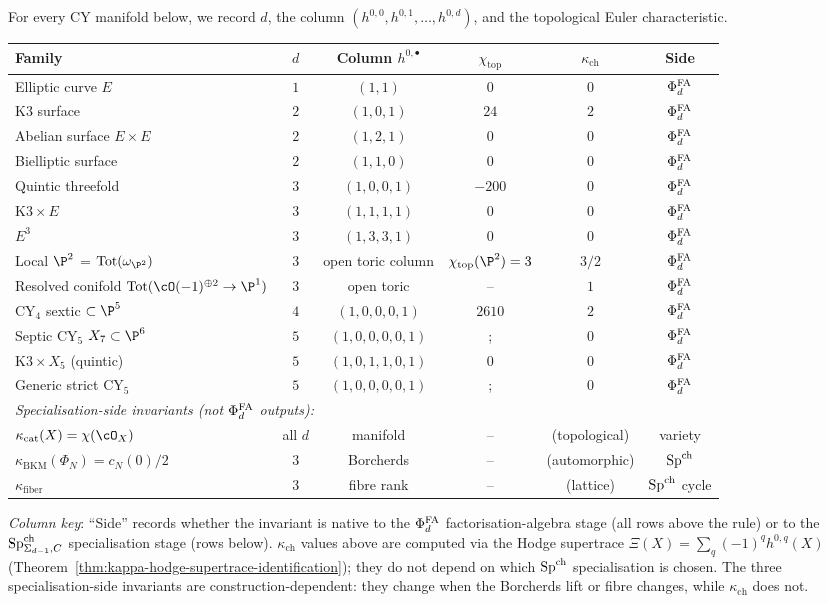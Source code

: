For every CY manifold below, we record $d$, the column
$(h^{0,0}, h^{0,1}, \ldots, h^{0,d})$, and the topological Euler
characteristic.

\begin{center}
\begin{tabular}{lccccc}
\toprule
Family & $d$ & Column $h^{0,\bullet}$ & $\chi_{\mathrm{top}}$ &
$\kappa_{\mathrm{ch}}$ & Side \\
\midrule
Elliptic curve $E$ & $1$ & $(1, 1)$ & $0$ & $0$ & $\Phi^{\mathrm{FA}}_d$ \\
K3 surface & $2$ & $(1, 0, 1)$ & $24$ & $2$ & $\Phi^{\mathrm{FA}}_d$ \\
Abelian surface $E \times E$ & $2$ & $(1, 2, 1)$ & $0$ & $0$ & $\Phi^{\mathrm{FA}}_d$ \\
Bielliptic surface & $2$ & $(1, 1, 0)$ & $0$ & $0$ & $\Phi^{\mathrm{FA}}_d$ \\
Quintic threefold & $3$ & $(1, 0, 0, 1)$ & $-200$ & $0$ & $\Phi^{\mathrm{FA}}_d$ \\
$\mathrm{K3} \times E$ & $3$ & $(1, 1, 1, 1)$ & $0$ & $0$ & $\Phi^{\mathrm{FA}}_d$ \\
$E^{3}$ & $3$ & $(1, 3, 3, 1)$ & $0$ & $0$ & $\Phi^{\mathrm{FA}}_d$ \\
Local $\P^2$ = $\mathrm{Tot}(\omega_{\P^2})$ & $3$ & open toric column &
$\chi_{\mathrm{top}}(\P^2) = 3$ & $3/2$ & $\Phi^{\mathrm{FA}}_d$ \\
Resolved conifold $\mathrm{Tot}(\cO(-1)^{\oplus 2} \to \P^1)$ & $3$ & open toric &
-- & $1$ & $\Phi^{\mathrm{FA}}_d$ \\
CY$_4$ sextic $\subset \P^5$ & $4$ & $(1, 0, 0, 0, 1)$ & $2610$ & $2$ & $\Phi^{\mathrm{FA}}_d$ \\
Septic CY$_5$ $X_7 \subset \P^6$ & $5$ & $(1, 0, 0, 0, 0, 1)$ &; & $0$ & $\Phi^{\mathrm{FA}}_d$ \\
$\mathrm{K3} \times X_5$ (quintic) & $5$ & $(1, 0, 1, 1, 0, 1)$ & $0$ & $0$ & $\Phi^{\mathrm{FA}}_d$ \\
Generic strict CY$_5$ & $5$ & $(1, 0, 0, 0, 0, 1)$ &; & $0$ & $\Phi^{\mathrm{FA}}_d$ \\
\midrule
\multicolumn{6}{l}{\small\itshape Specialisation-side invariants (not $\Phi^{\mathrm{FA}}_d$ outputs):} \\
$\kappa_{\mathrm{cat}}(X) = \chi(\cO_X)$ & all $d$ & manifold & -- & (topological) & variety \\
$\kappa_{\mathrm{BKM}}(\Phi_N) = c_N(0)/2$ & $3$ & Borcherds & -- & (automorphic) & $\mathrm{Sp}^{\mathrm{ch}}$ \\
$\kappa_{\mathrm{fiber}}$ & $3$ & fibre rank & -- & (lattice) & $\mathrm{Sp}^{\mathrm{ch}}$ cycle \\
\bottomrule
\end{tabular}
\end{center}
\noindent
\textit{Column key}: ``Side'' records whether the invariant is native to
the $\Phi^{\mathrm{FA}}_d$ factorisation-algebra stage (all rows above the rule) or
to the $\mathrm{Sp}^{\mathrm{ch}}_{\Sigma_{d-1},C}$ specialisation stage (rows below).
$\kappa_{\mathrm{ch}}$ values above are computed via the Hodge supertrace
$\Xi(X) = \sum_q(-1)^q h^{0,q}(X)$
(Theorem~\ref{thm:kappa-hodge-supertrace-identification}); they do not
depend on which $\mathrm{Sp}^{\mathrm{ch}}$ specialisation is chosen. The three
specialisation-side invariants are construction-dependent: they change
when the Borcherds lift or fibre changes, while $\kappa_{\mathrm{ch}}$
does not.

